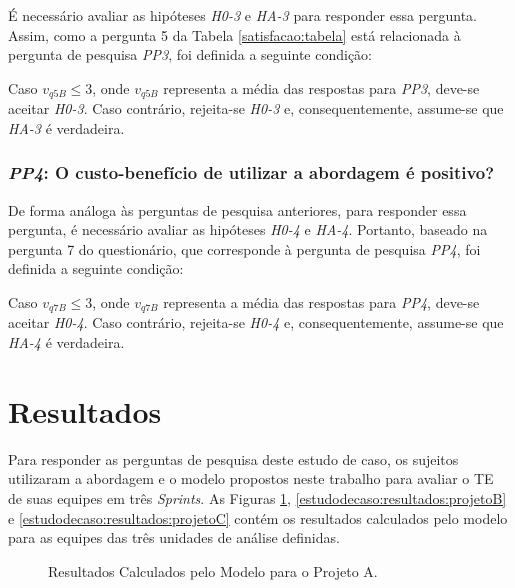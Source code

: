 É necessário avaliar as hipóteses \textit{H0-3} e \textit{HA-3} para responder essa pergunta. Assim, como a pergunta 5 da Tabela \ref{satisfacao:tabela} está relacionada à pergunta de pesquisa \textit{PP3}, foi definida a seguinte condição:

Caso $v_{q5B} \le 3$, onde $v_{q5B}$ representa a média das respostas para \textit{PP3}, deve-se aceitar \textit{H0-3}. Caso contrário, rejeita-se \textit{H0-3} e, consequentemente, assume-se que \textit{HA-3} é verdadeira.

\subsubsection{\textit{PP4}: O custo-benefício de utilizar a abordagem é positivo?}

De forma análoga às perguntas de pesquisa anteriores, para responder essa pergunta, é necessário avaliar as hipóteses \textit{H0-4} e \textit{HA-4}. Portanto, baseado na pergunta 7 do questionário, que corresponde à pergunta de pesquisa \textit{PP4}, foi definida a seguinte condição:

Caso $v_{q7B} \le 3$, onde $v_{q7B}$ representa a média das respostas para \textit{PP4}, deve-se aceitar \textit{H0-4}. Caso contrário, rejeita-se \textit{H0-4} e, consequentemente, assume-se que \textit{HA-4} é verdadeira.

\section{Resultados}
\label{estudodecaso:resultados}

Para responder as perguntas de pesquisa deste estudo de caso, os sujeitos utilizaram a abordagem e o modelo propostos neste trabalho para avaliar o TE de suas equipes em três \textit{Sprints}. As Figuras \ref{estudodecaso:resultados:projetoA}, \ref{estudodecaso:resultados:projetoB} e \ref{estudodecaso:resultados:projetoC} contém os resultados calculados pelo modelo para as equipes das três unidades de análise definidas.

\begin{figure}[H]
\begin{center}
	\end{center}
	\caption{Resultados Calculados pelo Modelo para o Projeto A.}
	\label{estudodecaso:resultados:projetoA}
\end{figure}

